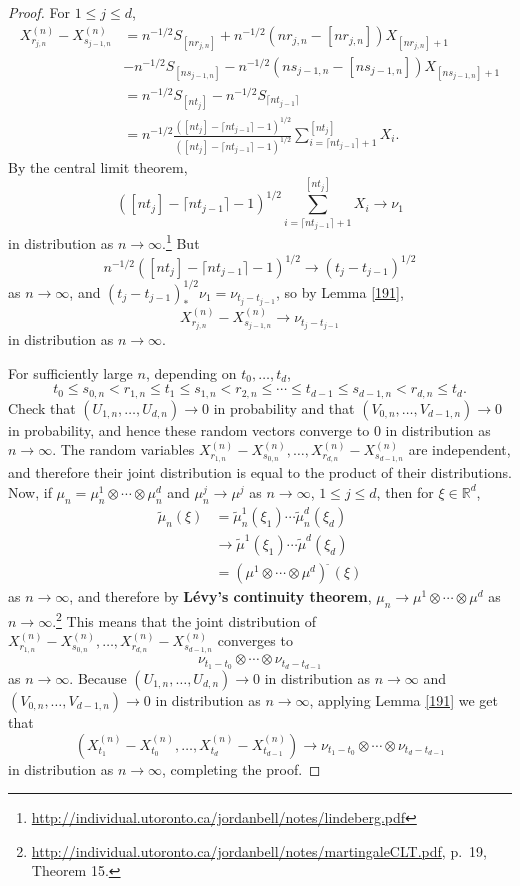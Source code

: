 \documentclass{article}
\theoremstyle{definition}
\begin{document}
\begin{proof}
For $1 \leq j \leq d$, 
\begin{align*}
X^{(n)}_{r_{j,n}} - X^{(n)}_{s_{j-1,n}} &= n^{-1/2} S_{[nr_{j,n}]} + n^{-1/2} (nr_{j,n} - [nr_{j,n}]) X_{[nr_{j,n}]+1}\\
&-n^{-1/2} S_{[ns_{j-1,n}]} - n^{-1/2} (ns_{j-1,n} - [ns_{j-1,n}]) X_{[ns_{j-1,n}]+1}\\
&=n^{-1/2} S_{[nt_j]} - n^{-1/2} S_{\lceil nt_{j-1} \rceil}\\
&=n^{-1/2} \frac{([nt_j] - \lceil nt_{j-1} \rceil - 1)^{1/2}}{([nt_j] - \lceil nt_{j-1} \rceil - 1)^{1/2}} \sum_{i=\lceil nt_{j-1} \rceil+1}^{[nt_j]} X_i.
\end{align*}
By the central limit theorem,
\[
([nt_j] - \lceil nt_{j-1} \rceil - 1)^{1/2}  \sum_{i=\lceil nt_{j-1} \rceil+1}^{[nt_j]} X_i \to \nu_1
\]
in distribution as $n \to \infty$.\footnote{\url{http://individual.utoronto.ca/jordanbell/notes/lindeberg.pdf}}
But
\[
n^{-1/2} ([nt_j] - \lceil nt_{j-1} \rceil - 1)^{1/2} \to (t_j-t_{j-1})^{1/2}
\]
as $n \to \infty$, and $(t_j-t_{j-1})^{1/2}_* \nu_1 = \nu_{t_j-t_{j-1}}$, 
so by Lemma \ref{191},
\[
X^{(n)}_{r_{j,n}} - X^{(n)}_{s_{j-1,n}}  \to  \nu_{t_j-t_{j-1}}
\]
in distribution as $n \to \infty$. 


For sufficiently large $n$, depending on $t_0,\ldots,t_d$, 
\[
t_0 \leq s_{0,n} < r_{1,n} \leq t_1 \leq s_{1,n} < r_{2,n} \leq \cdots \leq t_{d-1} \leq s_{d-1,n}
<r_{d,n} \leq t_d.
\]
Check that $(U_{1,n},\ldots,U_{d,n}) \to 0$ in probability and that $(V_{0,n},\ldots,V_{d-1,n}) \to 0$ in probability, and hence
these random vectors converge  to $0$ in distribution as $n \to \infty$. 
The random variables $X^{(n)}_{r_{1,n}}-X^{(n)}_{s_{0,n}},
\ldots,X^{(n)}_{r_{d,n}}-X^{(n)}_{s_{d-1,n}}$ are independent,  and therefore their joint distribution is equal to the product of their
distributions. 
Now, if $\mu_n = \mu_n^1 \otimes \cdots \otimes \mu_n^d$ and $\mu_n^j \to \mu^j$ as $n \to \infty$, $1 \leq j \leq d$, then for $\xi \in \mathbb{R}^d$,
\begin{align*}
\widetilde{\mu}_n(\xi)&=\widetilde{\mu}_n^1(\xi_1) \cdots \widetilde{\mu}_n^d(\xi_d)\\
&\to \widetilde{\mu}^1(\xi_1) \cdots \widetilde{\mu}^d(\xi_d)\\
&=(\mu^1 \otimes \cdots \otimes \mu^d)^{\widetilde{\;}}(\xi)
\end{align*}
as $n \to \infty$, and therefore by \textbf{L\'evy's continuity theorem},
$\mu_n \to \mu^1 \otimes \cdots \otimes \mu^d$ as
$n \to \infty$.\footnote{\url{http://individual.utoronto.ca/jordanbell/notes/martingaleCLT.pdf}, p.~19, Theorem 15.}
This means that the joint distribution of $X^{(n)}_{r_{1,n}}-X^{(n)}_{s_{0,n}},
\ldots,X^{(n)}_{r_{d,n}}-X^{(n)}_{s_{d-1,n}}$ converges  to
\[
\nu_{t_1-t_0} \otimes \cdots \otimes \nu_{t_d-t_{d-1}}
\]
as $n \to \infty$. 
Because $(U_{1,n},\ldots,U_{d,n}) \to 0$ in distribution as $n \to \infty$ and $(V_{0,n},\ldots,V_{d-1,n}) \to 0$ in distribution as $n \to \infty$,
applying Lemma \ref{191} we get that 
\[
(X^{(n)}_{t_1} - X^{(n)}_{t_{0}},
\ldots,X^{(n)}_{t_d} - X^{(n)}_{t_{d-1}}) \to \nu_{t_1-t_0} \otimes \cdots \otimes \nu_{t_d-t_{d-1}}
\]
in distribution as $n \to \infty$, completing the proof.
\end{proof}
\end{document}
